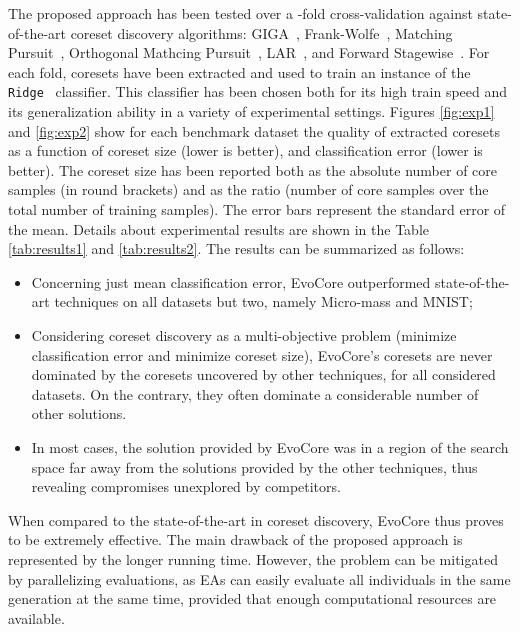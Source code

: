 \documentclass{article}
\begin{document}
The proposed approach has been tested over a -fold cross-validation against state-of-the-art coreset discovery algorithms: GIGA~\cite{campbell2018bayesian}, Frank-Wolfe~\cite{clarkson2010coresets}, Matching Pursuit~\cite{Pati1993}, Orthogonal Mathcing Pursuit~\cite{Pati1993}, LAR~\cite{Efron2004,Boutsidis2013}, and Forward Stagewise~\cite{Efroymson1960}.
For each fold, coresets have been extracted and used to train an instance of the \texttt{Ridge}~\cite{Tikhonov1943} classifier. This classifier has been chosen both for its high train speed and its generalization ability in a variety of experimental settings. Figures \ref{fig:exp1} and \ref{fig:exp2} show for each benchmark dataset the quality of extracted coresets as a function of coreset size (lower is better), and classification error (lower is better). The coreset size has been reported both as the absolute number of core samples (in round brackets) and as the ratio
 (number of core samples over the total number of training samples).
The error bars represent the standard error of the mean.
Details about experimental results are shown in the Table \ref{tab:results1} and \ref{tab:results2}. 
The results can be summarized as follows:
\begin{itemize}
    \item Concerning just mean classification error, EvoCore outperformed state-of-the-art techniques on all datasets but two, namely Micro-mass and MNIST;
    \item Considering coreset discovery as a multi-objective problem (minimize classification error and minimize coreset size), EvoCore's coresets are never dominated by the coresets uncovered by other techniques, for all considered datasets. On the contrary, they often dominate a considerable number of other solutions.
    \item In most cases, the solution provided by EvoCore was in a region of the search space far away from the solutions provided by the other techniques, thus revealing compromises unexplored by competitors.
\end{itemize}

When compared to the state-of-the-art in coreset discovery, EvoCore thus proves to be extremely effective. The main drawback of the proposed approach is represented by the longer running time. However, the problem can be mitigated by parallelizing evaluations, as EAs can easily evaluate all individuals in the same generation at the same time, provided that enough computational resources are available.
\end{document}
